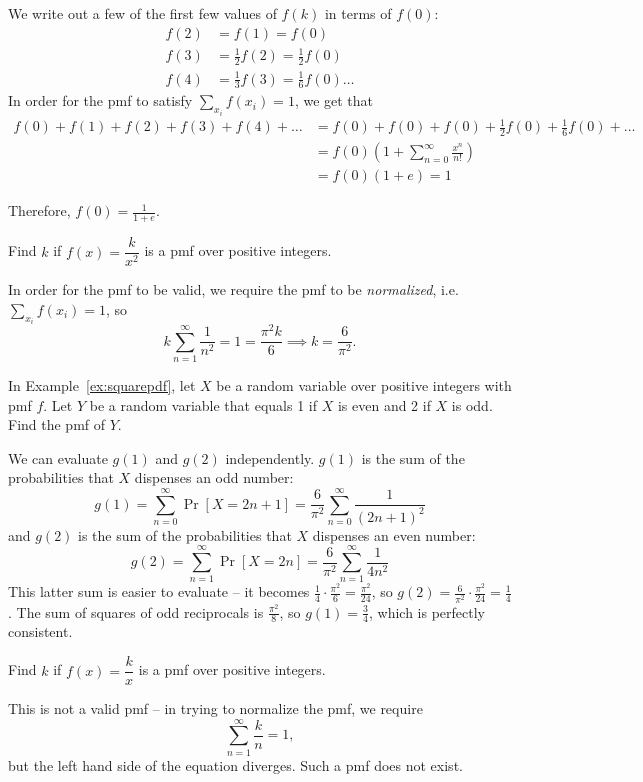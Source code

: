 \documentclass[../main.tex]{subfiles}
\begin{document}
\begin{solution}
We write out a few of the first few values of $f(k)$ in terms of $f(0)$: 
\begin{align*}
    f(2) &= f(1) = f(0) \\
    f(3) &= \frac{1}{2} f(2) = \frac 12 f(0)\\
    f(4) &= \frac 13 f(3) = \frac 16 f(0) \ldots 
\end{align*}
In order for the pmf to satisfy $\sum_{x_i} f(x_i) = 1$, we get that 
\begin{align*}
    f(0) + f(1) + f(2) + f(3) + f(4) + \ldots &= f(0) + f(0) + f(0) + \frac{1}{2} f(0) + \frac 16 f(0) + \ldots \\ &= f(0) \left(1 + \sum_{n=0}^\infty \frac{x^n}{n!}\right) \\ &= f(0) (1 + e) = 1
\end{align*}

Therefore, $f(0) = \frac{1}{1+e}$.
\end{solution}
\begin{example}
\label{ex:squarepdf}
Find $k$ if $f(x) = \dfrac{k}{x^2}$ is a pmf over positive integers.
\end{example}
\begin{solution}
In order for the pmf to be valid, we require the pmf to be \textit{normalized}, i.e. $\sum_{x_i} f(x_i) = 1$, so 
\[
    k \sum_{n=1}^\infty \frac{1}{n^2} = 1 = \frac{\pi^2 k}{6} \implies k = \frac{6}{\pi^2}.
\]
\end{solution}
\begin{example}
In Example~\ref{ex:squarepdf}, let $X$ be a random variable over positive
integers with pmf $f$. Let $Y$ be a random variable that equals 1 if $X$ is
even and 2 if $X$ is odd. Find the pmf of $Y$.
\end{example}
\begin{solution}
We can evaluate $g(1)$ and $g(2)$ independently. $g(1)$ is the sum of the probabilities that $X$ dispenses an odd number: 
\[
    g(1) = \sum_{n=0}^\infty \Pr[X = 2n+1] = \frac{6}{\pi^2}\sum_{n=0}^\infty \frac{1}{(2n+1)^2} 
\]
and $g(2)$ is the sum of the probabilities that $X$ dispenses an even number: 
\[
    g(2) = \sum_{n=1}^\infty \Pr[X = 2n] = \frac{6}{\pi^2}\sum_{n=1}^\infty \frac{1}{4n^2} 
\]
This latter sum is easier to evaluate -- it becomes $\frac 14 \cdot \frac{\pi^2}{6} = \frac{\pi^2}{24}$, so $g(2) = \frac{6}{\pi^2} \cdot \frac{\pi^2}{24} = \frac 14$. The sum of squares of odd reciprocals is $\frac{\pi^2}{8}$, so $g(1) = \frac 34$, which is perfectly consistent. 
\end{solution}
\begin{example}
Find $k$ if $f(x) = \dfrac{k}{x}$ is a pmf over positive integers.
\end{example}
\begin{solution}
This is not a valid pmf -- in trying to normalize the pmf, we require
\[
    \sum_{n = 1}^\infty \frac{k}{n} = 1,
\]
but the left hand side of the equation diverges. Such a pmf does not exist. 
\end{solution}
\end{document}
